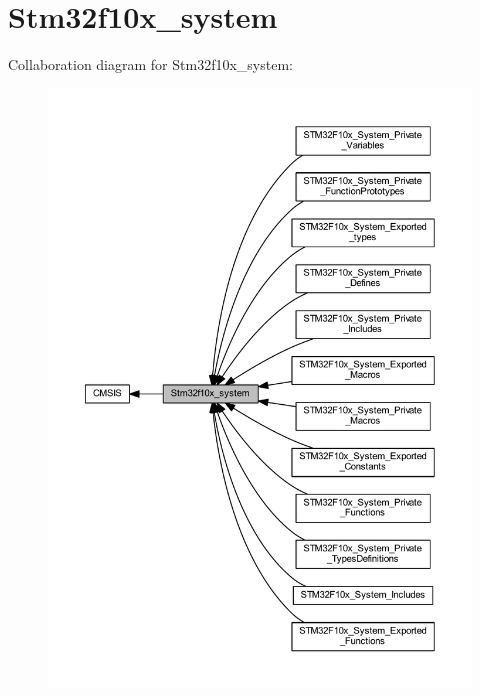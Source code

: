 \hypertarget{group__stm32f10x__system}{}\section{Stm32f10x\+\_\+system}
\label{group__stm32f10x__system}
Collaboration diagram for Stm32f10x\+\_\+system\+:
\nopagebreak
\begin{figure}[H]
\begin{center}
\leavevmode
\includegraphics[width=350pt]{group__stm32f10x__system}
\end{center}
\end{figure}
